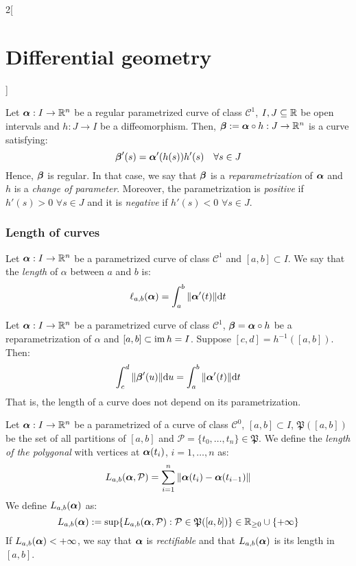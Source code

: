 \documentclass[../../../main.tex]{subfiles}
\begin{document}
\begin{multicols}{2}[\section{Differential geometry}]
\begin{definition}
  \end{definition}
  \begin{definition}
    Let $\boldsymbol{\mathrm{\alpha}}:I\rightarrow\mathbb{R}^n$ be a regular parametrized curve of class $\mathcal{C}^1$, $I,J\subseteq\mathbb{R}$ be open intervals and $h:J\rightarrow I$ be a diffeomorphism. Then, $\boldsymbol{\mathrm{\beta}}:=\boldsymbol{\mathrm{\alpha}}\circ h:J\rightarrow\mathbb{R}^n$ is a curve satisfying: $$\boldsymbol{\mathrm{\beta}}'(s)=\boldsymbol{\mathrm{\alpha}}'(h(s))h'(s)\quad\forall s\in J$$ Hence, $\boldsymbol{\mathrm{\beta}}$ is regular. In that case, we say that $\boldsymbol{\mathrm{\beta}}$ is a \emph{reparametrization} of $\boldsymbol{\mathrm{\alpha}}$ and $h$ is a \emph{change of parameter}. Moreover, the parametrization is \emph{positive} if $h'(s)>0$ $\forall s\in J$ and it is \emph{negative} if $h'(s)<0$ $\forall s\in J$.
  \end{definition}
  \subsubsection{Length of curves}
  \begin{definition}
    Let $\boldsymbol{\mathrm{\alpha}}:I\rightarrow\mathbb{R}^n$ be a parametrized curve of class $\mathcal{C}^1$ and $[a,b]\subset I$. We say that the \emph{length} of $\alpha$ between $a$ and $b$ is: $$\ell_{a,b}(\boldsymbol{\mathrm{\alpha}})=\int_a^b\|\boldsymbol{\mathrm{\alpha}}'(t)\|\dd t$$
  \end{definition}
  \begin{prop}
    Let $\boldsymbol{\mathrm{\alpha}}:I\rightarrow\mathbb{R}^n$ be a parametrized curve of class $\mathcal{C}^1$, $\boldsymbol{\mathrm{\beta}}=\boldsymbol{\mathrm{\alpha}}\circ h$ be a reparametrization of $\alpha$ and $[a,b]\subset \operatorname{im} h=I$. Suppose $[c,d]=h^{-1}([a,b])$. Then: $$\int_c^d\|\boldsymbol{\mathrm{\beta}}'(u)\|\dd u=\int_a^b\|\boldsymbol{\mathrm{\alpha}}'(t)\|\dd t$$ That is, the length of a curve does not depend on its parametrization.
  \end{prop}
  \begin{definition}
    Let $\boldsymbol{\mathrm{\alpha}}:I\rightarrow\mathbb{R}^n$ be a parametrized of a curve of class $\mathcal{C}^0$, $[a,b]\subset I$, $\mathfrak{P}([a,b])$ be the set of all partitions of $[a,b]$ and $\mathcal{P}=\{t_0,\ldots,t_n\}\in\mathfrak{P}$. We define the \emph{length of the polygonal} with vertices at $\boldsymbol{\mathrm{\alpha}}(t_i)$, $i=1,\ldots,n$ as: $$L_{a,b}(\boldsymbol{\mathrm{\alpha}},\mathcal{P})=\sum_{i=1}^n\|\boldsymbol{\mathrm{\alpha}}(t_i)-\boldsymbol{\mathrm{\alpha}}(t_{i-1})\|$$ We define $L_{a,b}(\boldsymbol{\mathrm{\alpha}})$ as:
    $$L_{a,b}(\boldsymbol{\mathrm{\alpha}}):=\sup\{L_{a,b}(\boldsymbol{\mathrm{\alpha}},\mathcal{P}):\mathcal{P}\in\mathfrak{P}([a,b])\}\in\mathbb{R}_{\geq 0}\cup\{+\infty\}$$ If $L_{a,b}(\boldsymbol{\mathrm{\alpha}})<+\infty$, we say that $\boldsymbol{\mathrm{\alpha}}$ is \emph{rectifiable} and that $L_{a,b}(\boldsymbol{\mathrm{\alpha}})$ is its length in $[a,b]$.

\end{definition}
\end{multicols}
\end{document}
